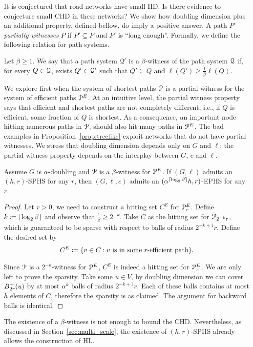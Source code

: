It is conjectured that road networks have small HD.
Is there evidence to conjecture small CHD in these networks?
We show how doubling dimension plus an additional property, defined bellow, do imply a positive answer.
A path $P'$ \emph{partially witnesses} $P$ if $P'\subseteq P$ and $P'$ is ``long enough''.
Formally, we define the following relation for path systems.

\begin{definition}
Let $\beta\geq 1$.
We say that a path system $\mathcal{Q}'$ is a $\beta$-witness of the path system $\mathcal{Q}$ if, for every $Q\in\mathcal{Q}$, exists $Q'\in\mathcal{Q}'$ such that $Q'\subseteq Q$ and $\ell(Q')\geq \frac{1}{\beta}\ell(Q)$.
\end{definition}

We explore first when the system of shortest paths $\mathcal{P}$ is a partial witness for the system of efficient paths $\mathcal{P}^E$.
At an intuitive level, the partial witness property says that efficient and shortest paths are not completely different, i.e., if $Q$ is efficient, some fraction of $Q$ is shortest.
As a consequence, an important node hitting numerous paths in $\mathcal{P}$, should also hit many paths in $\mathcal{P}^E$.
The bad examples in Proposition~\ref{prop:treelike} exploit networks that do not have partial witnesses.
We stress that doubling dimension depends only on $G$ and $\ell$; the partial witness property depends on the interplay between $G$, $c$ and $\ell$.

\begin{proposition}\label{prop:doubling}
Assume $G$ is $\alpha$-doubling and $\mathcal{P}$ is a $\beta$-witness for $\mathcal{P}^E$.
If $(G,\ell)$ admits an $(h,r)$-SPHS for any $r$, then $(G,\ell,c)$ admits an $(\alpha^{\lceil\log_2\beta\rceil} h,r)$-EPHS for any $r$.
\end{proposition}
\begin{proof}
Let $r>0$, we need to construct a hitting set $C^E$ for $\mathcal{P}_r^E$.
Define $k\coloneqq\lceil\log_2\beta\rceil$ and observe that $\frac{1}{\beta}\geq 2^{-k}$.
Take $C$ as the hitting set for $\mathcal{P}_{2^{-k}r}$, which is guaranteed to be sparse with respect to balls of radius $2^{-k+1}r$.
Define the desired set by
\[
C^E\coloneqq\{v\in C: v \text{ is in some $r$-efficient path} \}.
\]

Since $\mathcal{P}$ is a $2^{-k}$-witness for $\mathcal{P}^E$, $C^E$ is indeed a hitting set for $\mathcal{P}^E_r$.
We are only left to prove the sparsity.
Take some $u\in V$, by doubling dimension we can cover $B^+_{2r}(u)$ by at most $\alpha^k$ balls of radius $2^{-k+1}r$.
Each of these balls contains at most $h$ elements of $C$, therefore the sparsity is as claimed.
The argument for backward balls is identical.
\end{proof}

\begin{remark}
The existence of a $\beta$-witness is not enough to bound the CHD.
Nevertheless, as discussed in Section~\ref{sec:multi_scale}, the existence of $(h,r)$-SPHS already allows the construction of HL.
\end{remark}